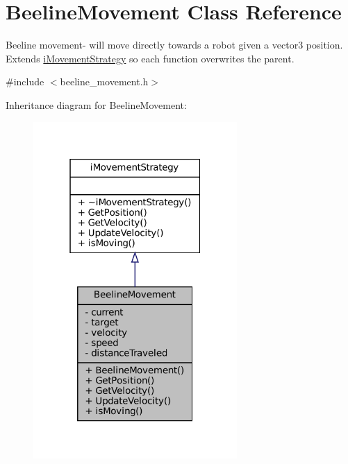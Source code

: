 \hypertarget{classBeelineMovement}{}\section{Beeline\+Movement Class Reference}
\label{classBeelineMovement}


Beeline movement-\/ will move directly towards a robot given a vector3 position. Extends \hyperlink{classiMovementStrategy}{i\+Movement\+Strategy} so each function overwrites the parent.  




{\ttfamily \#include $<$beeline\+\_\+movement.\+h$>$}



Inheritance diagram for Beeline\+Movement\+:\nopagebreak
\begin{figure}[H]
\begin{center}
\leavevmode
\includegraphics[width=220pt]{classBeelineMovement__inherit__graph}
\end{center}
\end{figure}


